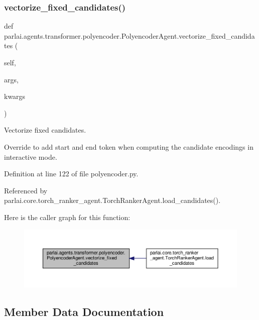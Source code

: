 \subsubsection{\texorpdfstring{vectorize\+\_\+fixed\+\_\+candidates()}{vectorize\_fixed\_candidates()}}
{\footnotesize\ttfamily def parlai.\+agents.\+transformer.\+polyencoder.\+Polyencoder\+Agent.\+vectorize\+\_\+fixed\+\_\+candidates (\begin{DoxyParamCaption}\item[{}]{self,  }\item[{}]{args,  }\item[{}]{kwargs }\end{DoxyParamCaption})}

\begin{DoxyVerb}Vectorize fixed candidates.

Override to add start and end token when computing the candidate encodings
in interactive mode.
\end{DoxyVerb}
 

Definition at line 122 of file polyencoder.\+py.



Referenced by parlai.\+core.\+torch\+\_\+ranker\+\_\+agent.\+Torch\+Ranker\+Agent.\+load\+\_\+candidates().

Here is the caller graph for this function\+:
\nopagebreak
\begin{figure}[H]
\begin{center}
\leavevmode
\includegraphics[width=350pt]{classparlai_1_1agents_1_1transformer_1_1polyencoder_1_1PolyencoderAgent_ad002f52bc5bfbe8269983bbfc0988f98_icgraph}
\end{center}
\end{figure}


\subsection{Member Data Documentation}
\mbox{\label{classparlai_1_1agents_1_1transformer_1_1polyencoder_1_1PolyencoderAgent_a7b415240e04df392cb8767911fc0ff68}} 
